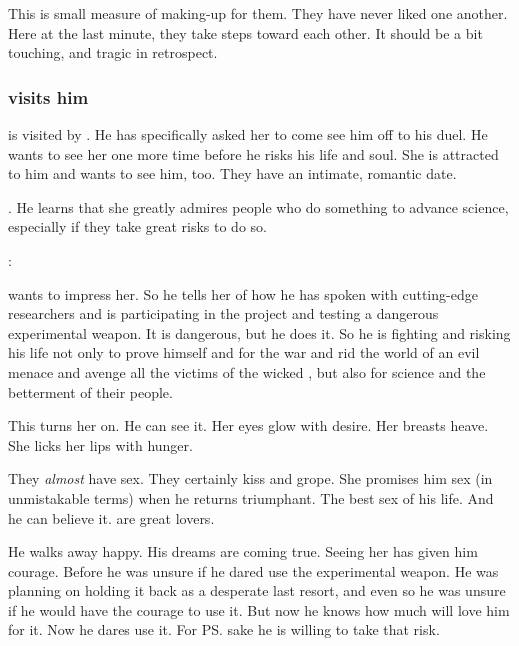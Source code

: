 This is small measure of making-up for them. 
They have never liked one another.
Here at the last minute, they take steps toward each other. 
It should be a bit touching, and tragic in retrospect. 





\subsubsection{\Firaxel{} visits him}
\Teshrial{} is visited by \Firaxel. 
He has specifically asked her to come see him off to his duel. 
He wants to see her one more time before he risks his life and soul. 
She is attracted to him and wants to see him, too. 
They have an intimate, romantic date. 

. 
He learns that she greatly admires people who do something to advance science, especially if they take great risks to do so. 

\begin{prose}
  \Firaxel: 
\end{prose}

\Teshrial{} wants to impress her. 
So he tells her of how he has spoken with cutting-edge researchers and is participating in the \neoresphan{} project and testing a dangerous experimental weapon. 
It is dangerous, but he does it. 
So he is fighting and risking his life not only to prove himself and for the war and rid the world of an evil menace and avenge all the victims of the wicked \Ishnaruchaefir, but also for science and the betterment of their people. 

This turns her on. 
He can see it. 
Her eyes glow with desire. 
Her breasts heave. 
She licks her lips with hunger. 

They \emph{almost} have sex. 
They certainly kiss and grope. 
She promises him sex (in unmistakable terms) when he returns triumphant. 
The best sex of his life. 
And he can believe it. 
\Resviel{} are great lovers. 

He walks away happy. 
His dreams are coming true. 
Seeing her has given him courage. 
Before he was unsure if he dared use the experimental weapon. 
He was planning on holding it back as a desperate last resort, and even so he was unsure if he would have the courage to use it. 
But now he knows how much \Firaxel{} will love him for it. 
Now he dares use it. 
For \ps{\Firaxel} sake he is willing to take that risk. 

